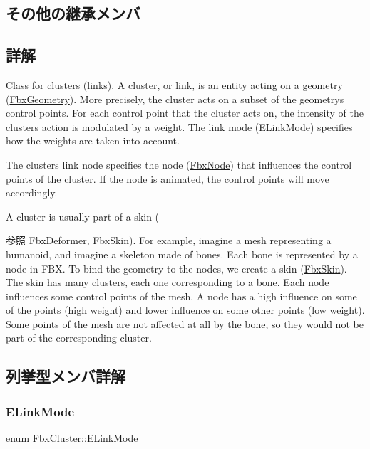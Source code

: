\subsection*{その他の継承メンバ}


\subsection{詳解}
Class for clusters (links). A cluster, or link, is an entity acting on a geometry (\hyperlink{class_fbx_geometry}{Fbx\+Geometry}). More precisely, the cluster acts on a subset of the geometry\textquotesingle{}s control points. For each control point that the cluster acts on, the intensity of the cluster\textquotesingle{}s action is modulated by a weight. The link mode (E\+Link\+Mode) specifies how the weights are taken into account.

The cluster\textquotesingle{}s link node specifies the node (\hyperlink{class_fbx_node}{Fbx\+Node}) that influences the control points of the cluster. If the node is animated, the control points will move accordingly.

A cluster is usually part of a skin (\begin{DoxySeeAlso}{参照}
\hyperlink{class_fbx_deformer}{Fbx\+Deformer}, \hyperlink{class_fbx_skin}{Fbx\+Skin}). For example, imagine a mesh representing a humanoid, and imagine a skeleton made of bones. Each bone is represented by a node in F\+BX. To bind the geometry to the nodes, we create a skin (\hyperlink{class_fbx_skin}{Fbx\+Skin}). The skin has many clusters, each one corresponding to a bone. Each node influences some control points of the mesh. A node has a high influence on some of the points (high weight) and lower influence on some other points (low weight). Some points of the mesh are not affected at all by the bone, so they would not be part of the corresponding cluster. 
\end{DoxySeeAlso}


\subsection{列挙型メンバ詳解}
\mbox{\label{class_fbx_cluster_aaa2afaedfd33eda65c46bb5a3d04dab0}} 
\subsubsection{\texorpdfstring{E\+Link\+Mode}{ELinkMode}}
{\footnotesize\ttfamily enum \hyperlink{class_fbx_cluster_aaa2afaedfd33eda65c46bb5a3d04dab0}{Fbx\+Cluster\+::\+E\+Link\+Mode}}

